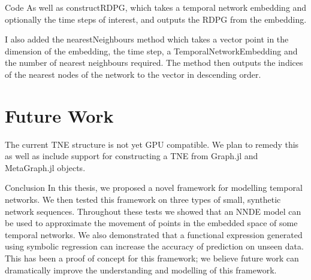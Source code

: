 \documentclass[12pt]{amsbook}
\begin{document}
\begin{chapter}{Code}
        As well as constructRDPG, which takes a temporal network embedding and optionally the time steps of interest, and outputs the RDPG from the embedding.

        I also added the nearestNeighbours method which takes a vector point in the dimension of the embedding, the time step, a TemporalNetworkEmbedding and the number of nearest neighbours required. The method then outputs the indices of the nearest nodes of the network to the vector in descending order.

    \section{Future Work}
        The current TNE structure is not yet GPU compatible. We plan to remedy this as well as include support for constructing a TNE from Graph.jl and MetaGraph.jl objects.

\end{chapter}

\begin{chapter}{Conclusion}
    In this thesis, we proposed a novel framework for modelling temporal networks. We then tested this framework on three types of small, synthetic network sequences. Throughout these tests we showed that an NNDE model can be used to approximate the movement of points in the embedded space of some temporal networks. We also demonstrated that a functional expression generated using symbolic regression can increase the accuracy of prediction on unseen data. This has been a proof of concept for this framework; we believe future work can dramatically improve the understanding and modelling of this framework.
\end{chapter} 


\printbibliography
\end{document}
